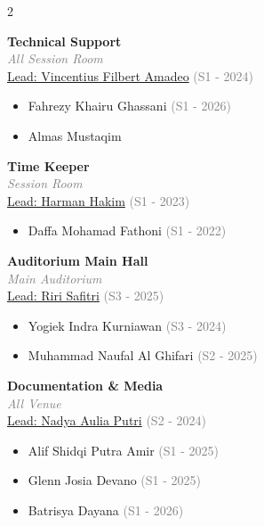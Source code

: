 \documentclass[10pt,a4paper]{article}
\begin{document}
\begin{multicols}{2}
\begin{minipage}{\linewidth}
\textbf{\color{conf}Technical Support}\\
\textcolor{gray}{\emph{All Session Room}}\\
\small \underline{Lead: Vincentius Filbert Amadeo} \textcolor{gray}{(S1 - 2024)}\\
\begin{itemize}\setlength{\itemsep}{0pt}
  \item Fahrezy Khairu Ghassani \textcolor{gray}{(S1 - 2026)}
  \item Almas Mustaqim
\end{itemize}
\end{minipage}
\vspace{0.8em}

\begin{minipage}{\linewidth}
\textbf{\color{conf}Time Keeper}\\
\textcolor{gray}{\emph{Session Room}}\\
\small \underline{Lead: Harman Hakim} \textcolor{gray}{(S1 - 2023)}\\
\begin{itemize}\setlength{\itemsep}{0pt}
  \item Daffa Mohamad Fathoni \textcolor{gray}{(S1 - 2022)}
\end{itemize}
\end{minipage}
\vspace{0.8em}

\begin{minipage}{\linewidth}
\textbf{\color{conf}Auditorium Main Hall}\\
\textcolor{gray}{\emph{Main Auditorium}}\\
\small \underline{Lead: Riri Safitri} \textcolor{gray}{(S3 - 2025)}\\
\begin{itemize}\setlength{\itemsep}{0pt}
  \item Yogiek Indra Kurniawan \textcolor{gray}{(S3 - 2024)}
  \item Muhammad Naufal Al Ghifari \textcolor{gray}{(S2 - 2025)}
\end{itemize}
\end{minipage}
\vspace{0.8em}

\begin{minipage}{\linewidth}
\textbf{\color{conf}Documentation \& Media}\\
\textcolor{gray}{\emph{All Venue}}\\
\small \underline{Lead: Nadya Aulia Putri} \textcolor{gray}{(S2 - 2024)}\\
\begin{itemize}\setlength{\itemsep}{0pt}
  \item Alif Shidqi Putra Amir \textcolor{gray}{(S1 - 2025)}
  \item Glenn Josia Devano \textcolor{gray}{(S1 - 2025)}
  \item Batrisya Dayana \textcolor{gray}{(S1 - 2026)}
\end{itemize}
\end{minipage}
\vspace{0.8em}


\end{multicols}
\end{document}
